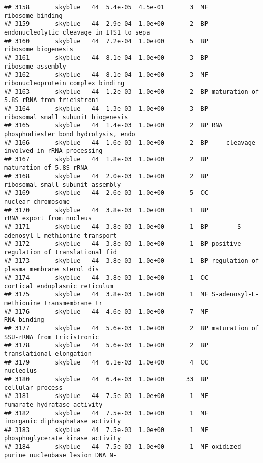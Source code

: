 \documentclass[]{article}
\begin{document}
\begin{verbatim}
## 3158       skyblue   44  5.4e-05  4.5e-01       3  MF                         ribosome binding
## 3159       skyblue   44  2.9e-04  1.0e+00       2  BP endonucleolytic cleavage in ITS1 to sepa
## 3160       skyblue   44  7.2e-04  1.0e+00       5  BP                      ribosome biogenesis
## 3161       skyblue   44  8.1e-04  1.0e+00       3  BP                        ribosome assembly
## 3162       skyblue   44  8.1e-04  1.0e+00       3  MF        ribonucleoprotein complex binding
## 3163       skyblue   44  1.2e-03  1.0e+00       2  BP maturation of 5.8S rRNA from tricistroni
## 3164       skyblue   44  1.3e-03  1.0e+00       3  BP       ribosomal small subunit biogenesis
## 3165       skyblue   44  1.4e-03  1.0e+00       2  BP RNA phosphodiester bond hydrolysis, endo
## 3166       skyblue   44  1.6e-03  1.0e+00       2  BP     cleavage involved in rRNA processing
## 3167       skyblue   44  1.8e-03  1.0e+00       2  BP                  maturation of 5.8S rRNA
## 3168       skyblue   44  2.0e-03  1.0e+00       2  BP         ribosomal small subunit assembly
## 3169       skyblue   44  2.6e-03  1.0e+00       5  CC                       nuclear chromosome
## 3170       skyblue   44  3.8e-03  1.0e+00       1  BP                 rRNA export from nucleus
## 3171       skyblue   44  3.8e-03  1.0e+00       1  BP        S-adenosyl-L-methionine transport
## 3172       skyblue   44  3.8e-03  1.0e+00       1  BP positive regulation of translational fid
## 3173       skyblue   44  3.8e-03  1.0e+00       1  BP regulation of plasma membrane sterol dis
## 3174       skyblue   44  3.8e-03  1.0e+00       1  CC           cortical endoplasmic reticulum
## 3175       skyblue   44  3.8e-03  1.0e+00       1  MF S-adenosyl-L-methionine transmembrane tr
## 3176       skyblue   44  4.6e-03  1.0e+00       7  MF                              RNA binding
## 3177       skyblue   44  5.6e-03  1.0e+00       2  BP maturation of SSU-rRNA from tricistronic
## 3178       skyblue   44  5.6e-03  1.0e+00       2  BP                 translational elongation
## 3179       skyblue   44  6.1e-03  1.0e+00       4  CC                                nucleolus
## 3180       skyblue   44  6.4e-03  1.0e+00      33  BP                         cellular process
## 3181       skyblue   44  7.5e-03  1.0e+00       1  MF              fumarate hydratase activity
## 3182       skyblue   44  7.5e-03  1.0e+00       1  MF         inorganic diphosphatase activity
## 3183       skyblue   44  7.5e-03  1.0e+00       1  MF         phosphoglycerate kinase activity
## 3184       skyblue   44  7.5e-03  1.0e+00       1  MF oxidized purine nucleobase lesion DNA N-

\end{verbatim}
\end{document}
